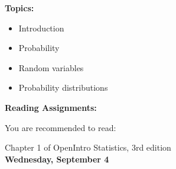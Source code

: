 \documentclass[11pt]{article}
\begin{document}
\vspace{2mm}
\noindent\textbf{Topics:}
\begin{itemize}
\item Introduction
\item Probability
\item Random variables
\item Probability distributions


\end{itemize}



\noindent\textbf{Reading Assignments:}

You are recommended to read:

Chapter 1 of OpenIntro Statistics, 3rd edition\\

%
%		
%

	\vspace{5mm}
\noindent\textbf{\large Wednesday, September 4} 
\end{document}

